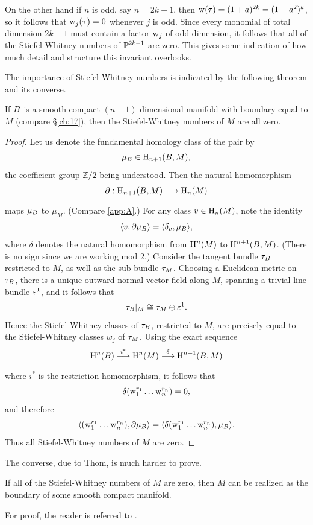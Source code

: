 \documentclass[../main]{subfiles}
\begin{document}
On the other hand if $n$ is odd, say $n=2k-1$, then $\operatorname{w}(\tau)=(1+a)^{2k}=(1+a^{2})^{k}$, so it follows that $\operatorname{w}_{j}(\tau)=0$ whenever $j$ is odd. Since every monomial of total dimension $2k-1$ must contain a factor $\operatorname{w}_{j}$ of odd dimension, it follows that all of the Stiefel-Whitney numbers of $\mathbb{P}^{2k-1}$ are zero. This gives some indication of how much detail and structure this invariant overlooks.

The importance of Stiefel-Whitney numbers is indicated by the following theorem and its converse.
\begin{theorem}[Pontrjagin]
\label{thm:04.09}
If $B$ is a smooth compact $(n+1)$-dimensional manifold with boundary equal to $M$ (compare \S\ref{ch:17}), then the Stiefel-Whitney numbers of $M$ are all zero.
\end{theorem}

\begin{proof}
Let us denote the fundamental homology class of the pair by
\[
\mu_{B}\in\operatorname{H}_{n+1}(B,M),
\]
the coefficient group $\mathbb{Z}/2$ being understood. Then the natural homomorphism
\[
 \partial:\homology_{n+1}(\B, M)\varrightarrow{} {\homology_{n}(M)}
\]
maps $\mu_{B}$ to $ \mu_M $. (Compare \ref{app:A}.) For any class $v\in \operatorname{H}_{n}(M)$, note the identity
\[
\langle v,\partial\mu_{B} \rangle=\langle\delta_{v},\mu_{B}\rangle,
\]
where $\delta$ denotes the natural homomorphism from $\operatorname{H}^{n}(M)$ to $\operatorname{H}^{n+1}(B ,M)$. (There is no sign since we are working mod $2$.) Consider the tangent	bundle $\tau_{B}$ restricted to $M$, as well as the sub-bundle $\tau_{M}$. Choosing a	Euclidean metric on $\tau_{B}$, there is a unique outward normal vector field along $M$, spanning a trivial line bundle $\varepsilon^1$, and it follows that
\[
\tau_{B} |_M\cong\tau_{M}\oplus\varepsilon^1.
\]
Hence the Stiefel-Whitney classes of $\tau_{B} $, restricted to $M$, are precisely equal to the Stiefel-Whitney classes $w_j$ of $\tau_{M}$. Using the exact sequence
\[
\homology^n(\B )\varrightarrow{i^\ast}\homology^n(M)\varrightarrow{\delta} \homology^{n+1}(\B,M)
\]
where $i^\ast $ is the restriction homomorphism, it follows that
\[
\delta({\operatorname{w}}_{1}^{r_{1}} \dots \operatorname{w}_{n}^{r_n})=0,
\]
and therefore
\[
\langle({\operatorname{w}}_{1}^{r_{1}} \dots \operatorname{w}_{n}^{r_n}),\partial\mu_{B} \rangle=\langle\delta({\operatorname{w}}_{1}^{r_{1}} \dots \operatorname{w}_{n}^{r_n}),\mu_{B} \rangle.
\]
Thus all Stiefel-Whitney numbers of $M$ are zero.
\end{proof}
The converse, due to Thom, is much harder to prove. 
\begin{theorem}[Thom]
\label{thm:04.10}
If all of the Stiefel-Whitney numbers
of $M$ are zero, then $M$ can be realized as the boundary of some smooth compact manifold.
\end{theorem}
For proof, the reader is referred to \cite{stongcobordism1968}.
\end{document}
